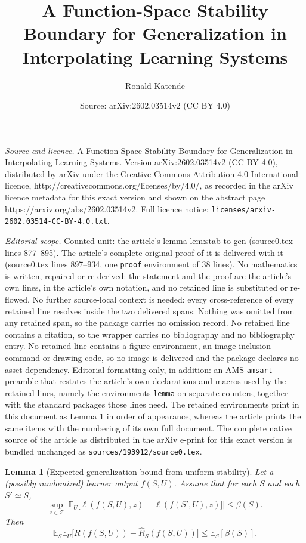 \documentclass[10pt,a4paper]{amsart}
\title{A Function-Space Stability Boundary for Generalization in Interpolating Learning Systems}
\author{Ronald Katende}
\date{Source: arXiv:2602.03514v2 (CC BY 4.0)}
\newtheorem{lemma}{Lemma}
\begin{document}
\maketitle

\noindent\emph{Source and licence.} A Function-Space Stability Boundary for Generalization in Interpolating Learning Systems. Version arXiv:2602.03514v2 (CC BY 4.0), distributed by arXiv under the Creative Commons Attribution 4.0 International licence, http://creativecommons.org/licenses/by/4.0/, as recorded in the arXiv licence metadata for this exact version and shown on the abstract page https://arxiv.org/abs/2602.03514v2. Full licence notice: \texttt{licenses/arxiv-2602.03514-CC-BY-4.0.txt}.\par\smallskip

\noindent\textit{Editorial scope.} Counted unit: the article's lemma lem:stab-to-gen (source0.tex lines 877--895). The article's complete original proof of it is delivered with it (source0.tex lines 897--934, one \texttt{proof} environment of 38 lines). No mathematics is written, repaired or re-derived: the statement and the proof are the article's own lines, in the article's own notation, and no retained line is substituted or re-flowed.  No further source-local context is needed: every cross-reference of every retained line resolves inside the two delivered spans.  Nothing was omitted from any retained span, so the package carries no omission record.  No retained line contains a citation, so the wrapper carries no bibliography and no bibliography entry.  No retained line contains a figure environment, an image-inclusion command or drawing code, so no image is delivered and the package declares no asset dependency.  Editorial formatting only, in addition: an AMS \texttt{amsart} preamble that restates the article's own declarations and macros used by the retained lines, namely the environments \texttt{lemma} on separate counters, together with the standard packages those lines need.  The retained environments print in this document as Lemma 1 in order of appearance, whereas the article prints the same items with the numbering of its own full document.  The complete native source of the article as distributed in the arXiv e-print for this exact version is bundled unchanged as \texttt{sources/193912/source0.tex}.
\begin{lemma}[Expected generalization bound from uniform stability]
	\label{lem:stab-to-gen}
	Let a (possibly randomized) learner output $f(S,U)$.
	Assume that for each $S$ and each $S'\simeq S$,
	\[
	\sup_{z\in\mathcal{Z}}
	\Big|
	\mathbb{E}_U\big[\ell(f(S,U),z)-\ell(f(S',U),z)\big]
	\Big|
	\le
	\beta(S).
	\]
	Then
	\[
	\mathbb{E}_S\mathbb{E}_U\big[R(f(S,U))-\widehat{R}_S(f(S,U))\big]
	\le
	\mathbb{E}_S[\beta(S)].
	\]
\end{lemma}
\end{document}
